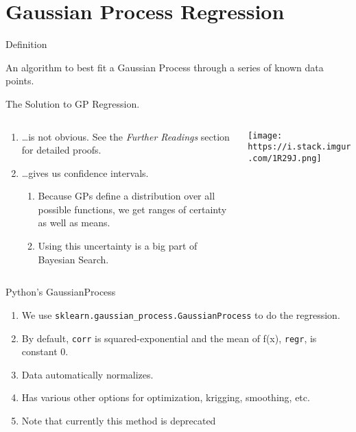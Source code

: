 \documentclass[10pt,ignorenonframetext,]{beamer}
\providecommand{\tightlist}{%
  \setlength{\itemsep}{0pt}\setlength{\parskip}{0pt}}
\begin{document}
\hypertarget{gaussian-process-regression}{%
\section{Gaussian Process
Regression}\label{gaussian-process-regression}}

\begin{frame}{Definition}
\protect\hypertarget{definition-1}{}

An algorithm to best fit a Gaussian Process through a series of known
data points.

\end{frame}

\begin{frame}{The Solution to GP Regression.}
\protect\hypertarget{the-solution-to-gp-regression.}{}

\begin{columns}[T]
\begin{column}{0.48\textwidth}
\begin{enumerate}
\tightlist
\item
  \ldots{}is not obvious. See the \emph{Further Readings} section for
  detailed proofs.
\item
  \ldots{}gives us confidence intervals.

  \begin{enumerate}
  \tightlist
  \item
    Because GPs define a distribution over all possible functions, we
    get ranges of certainty as well as means.
  \item
    Using this uncertainty is a big part of Bayesian Search.
  \end{enumerate}
\end{enumerate}
\end{column}

\begin{column}{0.48\textwidth}
\centering \texttt{[image: https://i.stack.imgur.com/1R29J.png]}
\end{column}
\end{columns}

\end{frame}

\begin{frame}[fragile]{Python's GaussianProcess}
\protect\hypertarget{pythons-gaussianprocess}{}

\begin{enumerate}
\tightlist
\item
  We use \texttt{sklearn.gaussian\_process.GaussianProcess} to do the
  regression.
\item
  By default, \texttt{corr} is squared-exponential and the mean of f(x),
  \texttt{regr}, is constant 0.
\item
  Data automatically normalizes.
\item
  Has various other options for optimization, krigging, smoothing, etc.
\item
  Note that currently this method is deprecated
\end{enumerate}

\end{frame}
\end{document}
